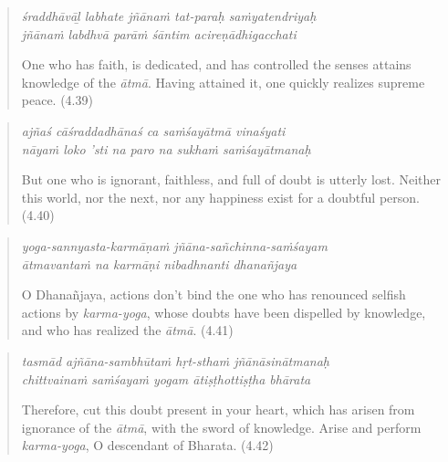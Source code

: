 \documentclass[12pt, twoside, openright]{memoir}
\begin{document}
\par
\begin{verse}
\textit{śraddhāvāḻ labhate jñānaṁ tat-paraḥ saṁyatendriyaḥ} \\
\textit{jñānaṁ labdhvā parāṁ śāntim acireṇādhigacchati}

\noindent One who has faith, is dedicated, and has controlled the senses attains knowledge of the \textit{ātmā}. Having attained it, one quickly realizes supreme peace. (4.39)
\end{verse}
\par



\par
\begin{verse}
\textit{ajñaś cāśraddadhānaś ca saṁśayātmā vinaśyati} \\
\textit{nāyaṁ loko ’sti na paro na sukhaṁ saṁśayātmanaḥ}

\noindent But one who is ignorant, faithless, and full of doubt is utterly lost. Neither this world, nor the next, nor any happiness exist for a doubtful person. (4.40)
\end{verse}
\par



\par
\begin{verse}
\textit{yoga-sannyasta-karmāṇaṁ jñāna-sañchinna-saṁśayam} \\
\textit{ātmavantaṁ na karmāṇi nibadhnanti dhanañjaya}

\noindent O Dhanañjaya, actions don't bind the one who has renounced selfish actions by \textit{karma-yoga}, whose doubts have been dispelled by knowledge, and who has realized the \textit{ātmā}. (4.41)
\end{verse}
\par



\par
\begin{verse}
\textit{tasmād ajñāna-sambhūtaṁ hṛt-sthaṁ jñānāsinātmanaḥ} \\
\textit{chittvainaṁ saṁśayaṁ yogam ātiṣṭhottiṣṭha bhārata}

\noindent Therefore, cut this doubt present in your heart, which has arisen from ignorance of the \textit{ātmā}, with the sword of knowledge. Arise and perform \textit{karma-yoga}, O descendant of Bharata. (4.42)
\end{verse}
\par
\end{document}
